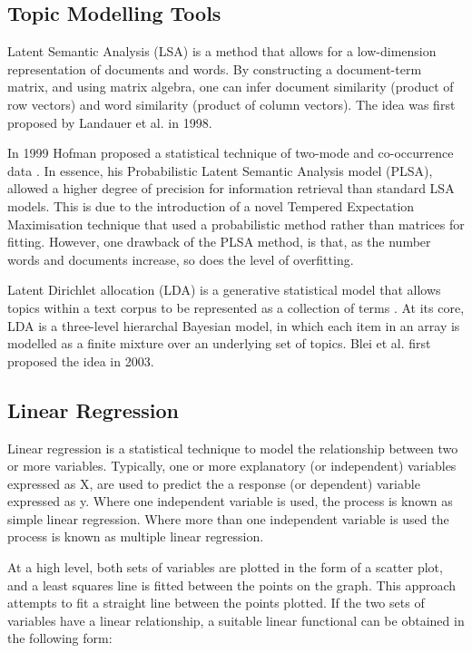 \subsection{Topic Modelling Tools}

Latent Semantic Analysis (LSA) is a method that allows for a low-dimension representation of documents and words. By constructing a document-term matrix, and using matrix algebra, one can infer document similarity (product of row vectors) and word similarity (product of column vectors). The idea was first proposed by Landauer et al. in 1998\cite{landauer1998introduction}.

In 1999 Hofman proposed a statistical technique of two-mode and co-occurrence data \cite{hofmann1999probabilistic}. In essence, his Probabilistic Latent Semantic Analysis model (PLSA), allowed a higher degree of precision for information retrieval than standard LSA models. This is due to the introduction of a novel Tempered Expectation Maximisation technique that used a probabilistic method rather than matrices for fitting. However, one drawback of the PLSA method, is that, as the number words and documents increase, so does the level of overfitting.

Latent Dirichlet allocation (LDA) is a generative statistical model that allows topics within a text corpus to be represented as a collection of terms \cite{blei2003latent}. At its core, LDA is a three-level hierarchal Bayesian model, in which each item in an array is modelled as a finite mixture over an underlying set of topics. Blei et al. first proposed the idea in 2003.

\subsection{Linear Regression}

Linear regression is a statistical technique to model the relationship between two or more variables. Typically, one or more explanatory (or independent) variables  expressed as X, are used to predict the a response (or dependent) variable expressed as y. Where one independent variable is used, the process is known as simple linear regression. Where more than one independent variable is used the process is known as multiple linear regression.

At a high level, both sets of variables are plotted in the form of a scatter plot, and a least squares line is fitted between the points on the graph. This approach attempts to fit a straight line between the points plotted. If the two sets of variables have a linear relationship, a suitable linear functional can be obtained in the following form:

